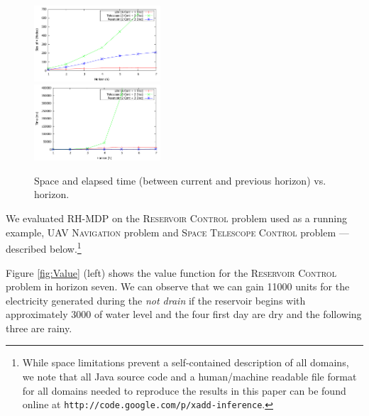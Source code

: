\begin{figure}[tbp!]
\vspace{-2mm}
\centering

\includegraphics[width=0.42\textwidth]{Figures/Nodes.pdf}\\
\vspace{-2mm}
\includegraphics[width=0.42\textwidth]{Figures/Time.pdf}

\vspace{-2mm}
\caption{\footnotesize Space and elapsed time (between current and previous horizon) vs. horizon.
}
\label{fig:SpaceTime}
\vspace{-4mm}
\end{figure}

\label{sec:results}

We evaluated RH-MDP on the \textsc{Reservoir Control} problem used as a running example,
\textsc{UAV Navigation} problem  and
\textsc{Space Telescope Control} problem --- described below.\footnote{While
space limitations prevent a self-contained
description of all domains, we note that all Java source code and a
human/machine readable file format for all domains needed to reproduce
the results in this paper can be found online at
\texttt{http://code.google.com/p/xadd-inference}.}

Figure \ref{fig:Value} (left) shows the value function for the \textsc{Reservoir Control} problem in horizon seven. We can observe that we can gain  11000 units for the electricity generated during the \emph{not drain} if the reservoir begins with approximately 3000 of water level and the four first day are dry and the following three are rainy.

